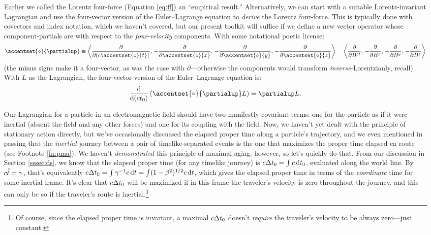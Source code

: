 \documentclass[12pt]{article}
\renewcommand{\mathring}[1]{\accentset{\circ}{#1}}
\newcommand{\dd}[1]{\mathrm{d}#1}
\begin{document}
Earlier we called the Lorentz four-force (Equation \ref{eq:ff}) an ``empirical result." Alternatively, we can start with a suitable Lorentz-invariant Lagrangian and use the four-vector version of the Euler--Lagrange equation to \emph{derive} the Lorentz four-force. This is typically done with covectors and index notation, which we haven't covered, but our present toolkit will suffice if we define a new vector operator whose component-partials are with respect to the \emph{four-velocity} components. With some notational poetic license:
\begin{equation*}
\mathring{\partialup} \equiv \left \langle \dfrac{\partial}{\partial (c \mathring{t} \mkern1mu )} , \,  - \dfrac{\partial}{\partial \mathring{x}} , \, - \dfrac{\partial}{\partial \mathring{y}} , \, - \dfrac{\partial}{\partial \mathring{z}} \right \rangle = \left \langle \dfrac{\partial}{\partial B^{ct}} , \,  - \dfrac{\partial}{\partial B^x} , \, - \dfrac{\partial}{\partial B^y} , \, - \dfrac{\partial}{\partial B^z} \right \rangle
\end{equation*}
(the minus signs make it a four-vector, as was the case with $\partialup$---otherwise the components would transform \emph{inverse}-Lorentzianly, recall). With $L$ as the Lagrangian, the four-vector version of the Euler--Lagrange equation is:
\begin{equation}\label{eq:ele}
\dfrac{\dd}{\dd (c t_0)} \, ( \mathring{\partialup} L ) = \partialup L .
\end{equation}

Our Lagrangian for a particle in an electromagnetic field should have two manifestly covariant terms: one for the particle as if it were inertial (absent the field and any other forces) and one for its coupling with the field. Now, we haven't yet dealt with the principle of stationary action directly, but we've occasionally discussed the elapsed proper time along a particle's trajectory, and we even mentioned in passing that the \emph{inertial} journey between a pair of timelike-separated events is the one that maximizes the proper time elapsed en route (see Footnote \ref{fn:pma}). We haven't \emph{demonstrated} this principle of maximal aging, however, so let's quickly do that. From our discussion in Section \ref{sssec:ds}, we know that the elapsed proper time (for any timelike journey) is $c \mkern.5mu \Delta t_0 = \int c \, \dd t_0$, evaluated along the world line. By $c\mathring{t} = \gamma$, that's equivalently $c \mkern.5mu \Delta t_0 = \int \gamma^{-1} c \, \dd t = \int (1 - \beta^2)^{1/2} c \, \dd t $, which gives the elapsed proper time in terms of the \emph{coordinate} time for some inertial frame. It's clear that $c \mkern.5mu \Delta t_0$ will be maximized if in this frame the traveler's velocity is zero throughout the journey, and this can only be so if the traveler's route is inertial.\footnote{Of course, since the elapsed proper time is invariant, a maximal $c \mkern.5mu \Delta t_0$ doesn't \emph{require} the traveler's velocity to be always zero---just constant.}
\end{document}
